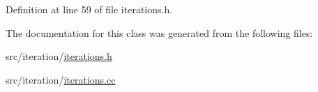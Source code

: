 Definition at line 59 of file iterations.\+h.



The documentation for this class was generated from the following files\+:\begin{DoxyCompactItemize}
\item 
src/iteration/\hyperlink{iterations_8h}{iterations.\+h}\item 
src/iteration/\hyperlink{iterations_8cc}{iterations.\+cc}\end{DoxyCompactItemize}
